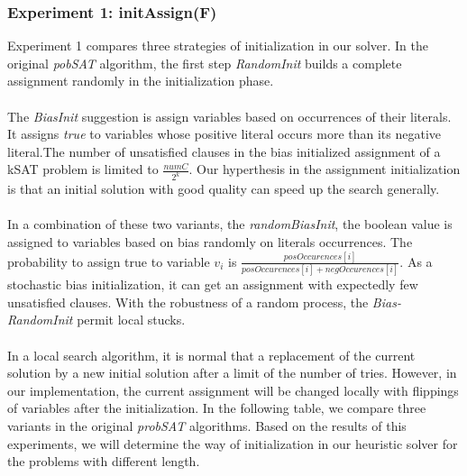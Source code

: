\documentclass[12pt,a4paper,twoside]{scrartcl}
\numberwithin{equation}{section}
\begin{document}
\subsubsection{Experiment 1: initAssign(F)}
\label{sec:Experiment 1}
Experiment 1 compares three strategies of initialization in our solver. In the original \emph{pobSAT} algorithm, the first step \emph{RandomInit}  builds a complete assignment randomly in the initialization phase. \\ \\The \emph{BiasInit} suggestion is assign variables based on occurrences of their literals. It assigns \emph{true} to variables whose positive literal occurs more than its negative literal.The number of unsatisfied clauses in the bias initialized assignment of a kSAT problem is limited to $\frac{numC}{2^k}$. Our hyperthesis in the assignment initialization is that an initial solution with good quality can speed up the search generally. \\ \\ In a combination of these two variants, the \emph{randomBiasInit}, the boolean value is assigned to variables based on bias randomly on literals occurrences. The probability to assign true to variable $v_i$ is $\frac{posOccurences[i]}{posOccurences[i]+negOccurences[i]}$. As a stochastic bias initialization, it can get an assignment with expectedly few unsatisfied clauses. With the robustness of a random process, the \emph{Bias-RandomInit} permit local stucks. \\\\ In a local search algorithm, it is normal that a replacement of the current solution by a new initial solution after a limit of the number of tries. However, in our implementation, the current assignment will be changed locally with flippings of variables after the initialization. In the following table, we compare three variants in the original \emph{probSAT} algorithms. Based on the results of this experiments, we will determine the way of initialization in our heuristic solver for the problems with different length. 
\\
\end{document}
